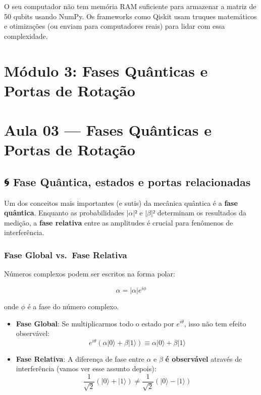 \documentclass[
  brazilian,
]{report}
\begin{document}
O seu computador não tem memória RAM suficiente para armazenar a matriz
de 50 qubits usando NumPy. Os frameworks como Qiskit usam truques
matemáticos e otimizações (ou enviam para computadores reais) para lidar
com essa complexidade.

\newpage

\chapter{Módulo 3: Fases Quânticas e Portas de
Rotação}\label{muxf3dulo-3-fases-quuxe2nticas-e-portas-de-rotauxe7uxe3o}

\chapter{Aula 03 --- Fases Quânticas e Portas de
Rotação}\label{aula-03-fases-quuxe2nticas-e-portas-de-rotauxe7uxe3o}

\section{🌀 Fase Quântica, estados e portas
relacionadas}\label{fase-quuxe2ntica-estados-e-portas-relacionadas}

Um dos conceitos mais importantes (e sutis) da mecânica quântica é a
\textbf{fase quântica}. Enquanto as probabilidades \(|𝛼|²\) e \(|𝛽|²\)
determinam os resultados da medição, a \textbf{fase relativa} entre as
amplitudes é crucial para fenômenos de interferência.

\subsection{Fase Global vs.~Fase
Relativa}\label{fase-global-vs.-fase-relativa}

Números complexos podem ser escritos na forma polar:

\[𝛼 = |𝛼| e^{i\phi}\]

onde \(\phi\) é a fase do número complexo.

\begin{itemize}
\item
  \textbf{Fase Global}: Se multiplicarmos todo o estado por
  \(e^{i\theta}\), isso não tem efeito observável:
  \[e^{i\theta}(𝛼|0⟩ + 𝛽|1⟩) \equiv 𝛼|0⟩ + 𝛽|1⟩\]
\item
  \textbf{Fase Relativa}: A diferença de fase entre \(𝛼\) e \(𝛽\)
  \textbf{é observável} através de interferência (vamos ver esse assunto
  depois):
  \[\frac{1}{\sqrt{2}}(|0⟩ + |1⟩) \neq \frac{1}{\sqrt{2}}(|0⟩ - |1⟩)\]
\end{itemize}
\end{document}
